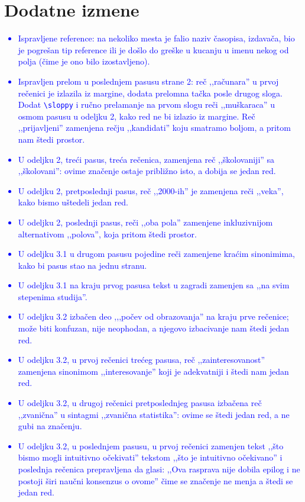 \documentclass[a4paper]{report}
\newcommand{\odgovor}[1]{\textcolor{blue}{#1}}
\begin{document}
\chapter{Dodatne izmene}
\odgovor{
\begin{itemize}
\item Ispravljene reference: na nekoliko mesta je falio naziv časopisa, izdavača, bio je pogrešan tip reference ili je došlo do greške u kucanju u imenu nekog od polja (čime je ono bilo izostavljeno).
\item Ispravljen prelom u poslednjem pasusu strane 2: reč ,,računara'' u prvoj rečenici je izlazila iz margine, dodata prelomna tačka posle drugog sloga. Dodat \texttt{\textbackslash{}sloppy} i ručno prelamanje na prvom slogu reči ,,muškaraca'' u osmom pasusu u odeljku 2, kako red ne bi izlazio iz margine. Reč ,,prijavljeni'' zamenjena rečju ,,kandidati'' koju smatramo boljom, a pritom nam štedi prostor.
\item U odeljku 2, treći pasus, treća rečenica, zamenjena reč ,,školovaniji'' sa ,,školovani'': ovime značenje ostaje približno isto, a dobija se jedan red.
\item {U odeljku 2, pretposlednji pasus, reč ,,2000-ih'' je zamenjena reči ,,veka'', kako bismo uštedeli jedan red.}
\item {U odeljku 2, poslednji pasus, reči ,,oba pola'' zamenjene inkluzivnijom alternativom ,,polova'', koja pritom štedi prostor.}
\item {U odeljku 3.1 u drugom pasusu pojedine reči zamenjene kraćim sinonimima, kako bi pasus stao na jednu stranu.}
\item {U odeljku 3.1 na kraju prvog pasusa tekst u zagradi zamenjen sa ,,na svim stepenima studija''.}
\item {U odeljku 3.2 izbačen deo ,,,počev od obrazovanja'' na kraju prve rečenice; može biti konfuzan, nije neophodan, a njegovo izbacivanje nam štedi jedan red.}
\item {U odeljku 3.2, u prvoj rečenici trećeg pasusa, reč ,,zainteresovanost'' zamenjena sinonimom ,,interesovanje'' koji je adekvatniji i štedi nam jedan red.}
\item {U odeljku 3.2, u drugoj rečenici pretposlednjeg pasusa izbačena reč ,,zvanična'' u sintagmi ,,zvanična statistika'': ovime se štedi jedan red, a ne gubi na značenju.}
\item {U odeljku 3.2, u poslednjem pasusu, u prvoj rečenici zamenjen tekst ,,što bismo mogli intuitivno očekivati'' tekstom ,,što je intuitivno očekivano'' i poslednja rečenica prepravljena da glasi: ,,Ova rasprava nije dobila epilog i ne postoji širi naučni konsenzus o ovome'' čime se značenje ne menja a štedi se jedan red.}

\end{itemize}}
\end{document}
